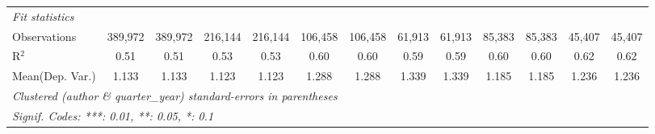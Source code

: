 \begin{tabular}{lcccccccccccc}
   \midrule
   \emph{Fit statistics}\\
   Observations                             & 389,972       & 389,972       & 216,144       & 216,144        & 106,458       & 106,458       & 61,913         & 61,913         & 85,383  & 85,383   & 45,407       & 45,407\\  
   R$^2$                                    & 0.51          & 0.51          & 0.53          & 0.53           & 0.60          & 0.60          & 0.59           & 0.59           & 0.60    & 0.60     & 0.62         & 0.62\\  
Mean(Dep. Var.) & 1.133 & 1.133 & 1.123 & 1.123 & 1.288 & 1.288 & 1.339 & 1.339 & 1.185 & 1.185 & 1.236 & 1.236 \\
   \midrule \midrule
   \multicolumn{13}{l}{\emph{Clustered (author \& quarter\_year) standard-errors in parentheses}}\\
   \multicolumn{13}{l}{\emph{Signif. Codes: ***: 0.01, **: 0.05, *: 0.1}}\\
\end{tabular}
\par\endgroup
